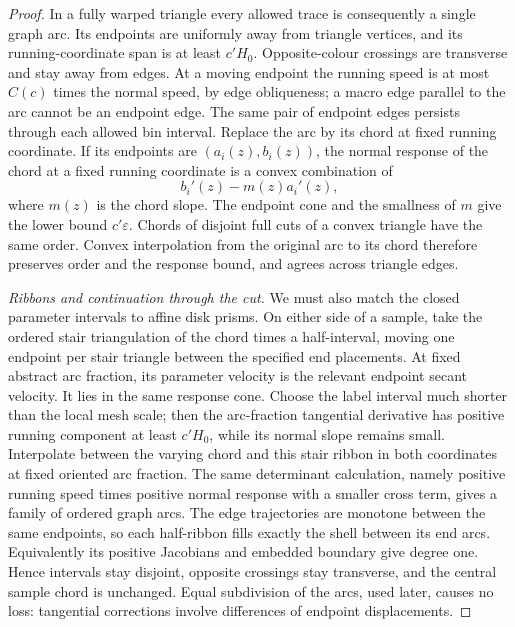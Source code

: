 \documentclass[11pt]{article}
\numberwithin{equation}{section}
\theoremstyle{definition}
\theoremstyle{remark}
\begin{document}
\begin{proof}
In a fully warped triangle every allowed trace is consequently a
single graph arc.  Its endpoints are uniformly away from triangle
vertices, and its running-coordinate span is at least $c'H_0$.
Opposite-colour crossings are transverse and stay away from edges.
At a moving endpoint the running speed is at most $C(c)$ times the
normal speed, by edge obliqueness; a macro edge parallel to the arc
cannot be an endpoint edge.  The same pair of endpoint edges persists
through each allowed bin interval.  Replace the arc by its chord at
fixed running coordinate.  If its endpoints are $(a_i(z),b_i(z))$,
the normal response of the chord at a fixed running coordinate is a
convex combination of
\[
 b_i'(z)-m(z)a_i'(z),
\]
where $m(z)$ is the chord slope.  The endpoint cone and the smallness
of $m$ give the lower bound $c'\varepsilon$.  Chords of disjoint
full cuts of a convex triangle have the same order.  Convex
interpolation from the original arc to its chord therefore preserves
order and the response bound, and agrees across triangle edges.

\emph{Ribbons and continuation through the cut.}
We must also match the closed parameter intervals to affine disk
prisms.  On either side of a sample, take the ordered stair
triangulation of the chord times a half-interval, moving one endpoint
per stair triangle between the specified end placements.  At fixed
abstract arc fraction, its parameter velocity is the relevant
endpoint secant velocity.  It lies in the same response cone.
Choose the label interval much shorter than the local mesh scale;
then the arc-fraction tangential derivative has positive running
component at least $c'H_0$, while its normal slope remains small.
Interpolate between the varying chord and this stair ribbon in both
coordinates at fixed oriented arc fraction.  The same determinant
calculation, namely positive running speed times positive normal
response with a smaller cross term, gives a family of ordered graph
arcs.  The edge trajectories are monotone between the same
endpoints, so each half-ribbon fills exactly the shell between its
end arcs.  Equivalently its positive Jacobians and embedded boundary
give degree one.  Hence intervals stay disjoint, opposite crossings
stay transverse, and the central sample chord is unchanged.  Equal
subdivision of the arcs, used later, causes no loss: tangential
corrections involve differences of endpoint displacements.


\end{proof}
\end{document}
